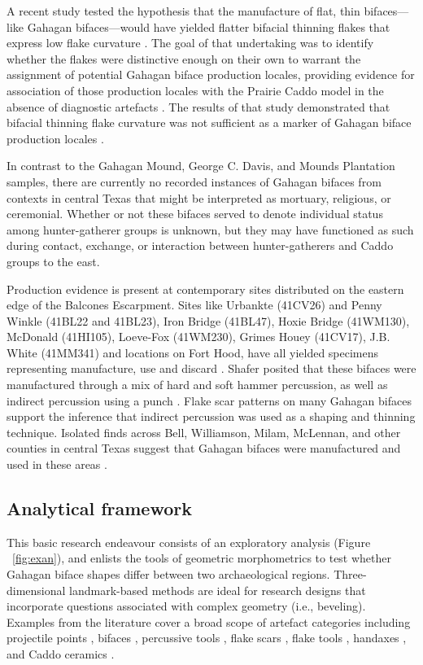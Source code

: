 \documentclass[review]{elsarticle}
\begin{document}
A recent study tested the hypothesis that the manufacture of flat, thin bifaces—like Gahagan bifaces—would have yielded flatter bifacial thinning flakes that express low flake curvature \citep{RN11568}. The goal of that undertaking was to identify whether the flakes were distinctive enough on their own to warrant the assignment of potential Gahagan biface production locales, providing evidence for association of those production locales with the Prairie Caddo model \citep{RN4924} in the absence of diagnostic artefacts \citep{RN11568}. The results of that study demonstrated that bifacial thinning flake curvature was not sufficient as a marker of Gahagan biface production locales \citep{RN11568}.

In contrast to the Gahagan Mound, George C. Davis, and Mounds Plantation samples, there are currently no recorded instances of Gahagan bifaces from contexts in central Texas that might be interpreted as mortuary, religious, or ceremonial. Whether or not these bifaces served to denote individual status among hunter-gatherer groups is unknown, but they may have functioned as such during contact, exchange, or interaction between hunter-gatherers and Caddo groups to the east.

Production evidence is present at contemporary sites distributed on the eastern edge of the Balcones Escarpment. Sites like Urbankte (41CV26) and Penny Winkle (41BL22 and 41BL23), Iron Bridge (41BL47), Hoxie Bridge (41WM130), McDonald (41HI105), Loeve-Fox (41WM230), Grimes Houey (41CV17), J.B. White (41MM341) and locations on Fort Hood, have all yielded specimens representing manufacture, use and discard \citep{RN20717,RN11565,RN2708,RN20718,RN4924,RN20719}. Shafer posited that these bifaces were manufactured through a mix of hard and soft hammer percussion, as well as indirect percussion using a punch \citep{RN4924,RN3684}. Flake scar patterns on many Gahagan bifaces support the inference that indirect percussion was used as a shaping and thinning technique. Isolated finds across Bell, Williamson, Milam, McLennan, and other counties in central Texas suggest that Gahagan bifaces were manufactured and used in these areas \citep{RN4924}.

\subsection*{Analytical framework}

This basic research endeavour \citep{RN20851} consists of an exploratory analysis (Figure ~\ref{fig:exan}), and enlists the tools of geometric morphometrics to test whether Gahagan biface shapes differ between two archaeological regions. Three-dimensional landmark-based methods are ideal for research designs that incorporate questions associated with complex geometry (i.e., beveling). Examples from the literature cover a broad scope of artefact categories including projectile points \citep{RN1750,RN1755}, bifaces \citep{RN1727,RN4392,RN11550,RN11783}, percussive tools \citep{RN1772}, flake scars \citep{RN253}, flake tools \citep{RN11552}, handaxes \citep{RN1730,RN1766,RN3145,RN1733,RN335}, and Caddo ceramics \citep{RN1994,RN11521,RN11782,RN11801,RN11716,RN20852}. 
\end{document}
